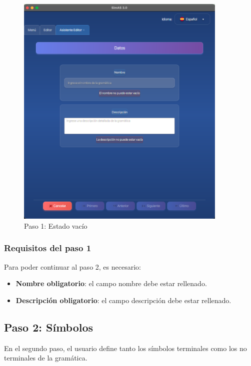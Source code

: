 \needspace{8cm}
\begin{figure}[H]
    \centering
    \includegraphics[width=0.9\textwidth]{figuras/editor/paso1_datos_vacio.png}
    \caption{Paso 1: Estado vacío}
    \label{fig:paso1_vacio}
\end{figure}

\subsubsection{Requisitos del paso 1}

Para poder continuar al paso 2, es necesario:

\begin{itemize}
    \item \textbf{Nombre obligatorio}: el campo nombre debe estar rellenado.
    \item \textbf{Descripción obligatorio}: el campo descripción debe estar rellenado.
\end{itemize}

\subsection{Paso 2: Símbolos}

En el segundo paso, el usuario define tanto los símbolos terminales como los no terminales de la gramática.

